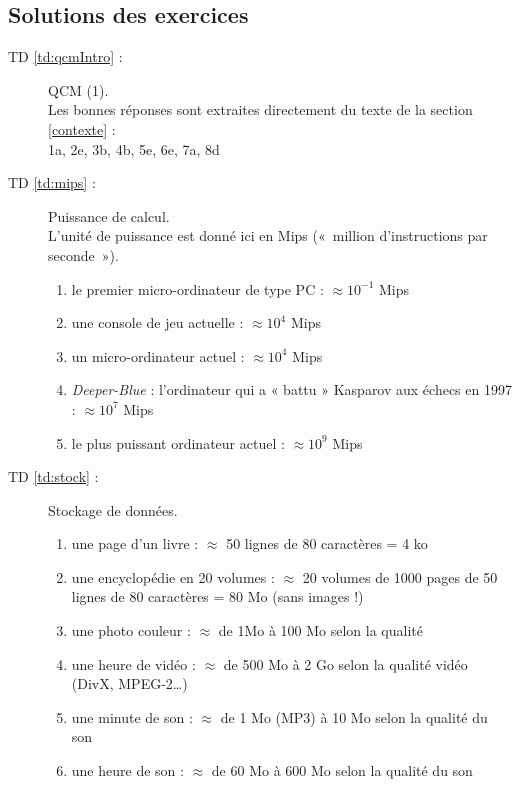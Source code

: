 \newpage
\subsection{Solutions des exercices}\label{sub:solutionsIntro}
\begin{description}
\item[TD \ref{td:qcmIntro} :] QCM (1).\\
	Les bonnes réponses sont extraites directement
	du texte de la section \ref{contexte} : \\
	1a, 2e, 3b, 4b, 5e, 6e, 7a, 8d
\item[TD \ref{td:mips} :] Puissance de calcul.\\
	L'unité de puissance est donné ici en Mips («~million d'instructions par
	seconde~»).
	\begin{enumerate}
	\item le premier micro-ordinateur de type PC : $\approx 10^{-1}$ Mips
	\item une console de jeu actuelle : $\approx 10^{4}$ Mips
	\item un micro-ordinateur actuel : $\approx 10^{4}$ Mips
	\item {\em Deeper-Blue} : l'ordinateur qui a « battu » Kasparov aux 
		échecs en 1997 : $\approx 10^{7}$ Mips
	\item le plus puissant ordinateur actuel : $\approx 10^{9}$ Mips
	\end{enumerate}
\item[TD \ref{td:stock} :] Stockage de données.

	\begin{enumerate}
	\item une page d'un livre : $\approx$ 50 lignes de 80 caractères = 4 ko
	\item une encyclopédie en 20 volumes : $\approx$ 20 volumes de 1000
	pages de 50 lignes de 80 caractères = 80 Mo (sans images !)
	\item une photo couleur : $\approx$ de 1Mo à 100 Mo selon la qualité
	\item une heure de vidéo : $\approx$ de 500 Mo à 2 Go 
		selon la qualité vidéo (DivX, MPEG-2\ldots)
	\item une minute de son : $\approx$ de 1 Mo (MP3) à 10 Mo 
		selon la qualité du son
	\item une heure de son : $\approx$ de 60 Mo à 600 Mo 
		selon la qualité du son
	\end{enumerate}


\end{description}
